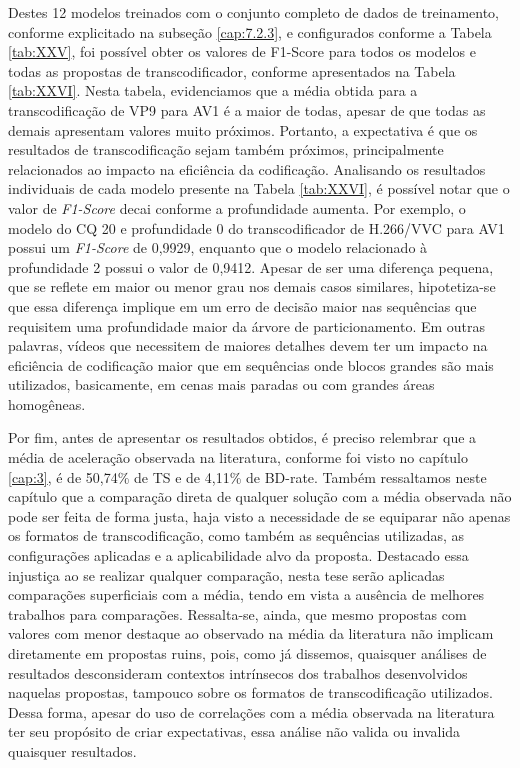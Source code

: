 Destes 12 modelos treinados com o conjunto completo de dados de treinamento, conforme explicitado na subseção \ref{cap:7.2.3}, e configurados conforme a Tabela \ref{tab:XXV}, foi possível obter os valores de F1-Score para todos os modelos e todas as propostas de transcodificador, conforme apresentados na Tabela \ref{tab:XXVI}. Nesta tabela, evidenciamos que a média obtida para a transcodificação de VP9 para AV1 é a maior de todas, apesar de que todas as demais apresentam valores muito próximos. Portanto, a expectativa é que os resultados de transcodificação sejam também próximos, principalmente relacionados ao impacto na eficiência da codificação. Analisando os resultados individuais de cada modelo presente na Tabela \ref{tab:XXVI}, é possível notar que o valor de \textit{F1-Score} decai conforme a profundidade aumenta. Por exemplo, o modelo do CQ 20 e profundidade 0 do transcodificador de H.266/VVC para AV1 possui um \textit{F1-Score} de 0,9929, enquanto que o modelo relacionado à profundidade 2 possui o valor de 0,9412. Apesar de ser uma diferença pequena, que se reflete em maior ou menor grau nos demais casos similares, hipotetiza-se que essa diferença implique em um erro de decisão maior nas sequências que requisitem uma profundidade maior da árvore de particionamento. Em outras palavras, vídeos que necessitem de maiores detalhes devem ter um impacto na eficiência de codificação maior que em sequências onde blocos grandes são mais utilizados, basicamente, em cenas mais paradas ou com grandes áreas homogêneas. 



Por fim, antes de apresentar os resultados obtidos, é preciso relembrar que a média de aceleração observada na literatura, conforme foi visto no capítulo \ref{cap:3}, é de 50,74\% de TS e de 4,11\% de BD-rate. Também ressaltamos neste capítulo que a comparação direta de qualquer solução com a média observada não pode ser feita de forma justa, haja visto a necessidade de se equiparar não apenas os formatos de transcodificação, como também as sequências utilizadas, as configurações aplicadas e a aplicabilidade alvo da proposta. Destacado essa injustiça ao se realizar qualquer comparação, nesta tese serão aplicadas comparações superficiais com a média, tendo em vista a ausência de melhores trabalhos para comparações. Ressalta-se, ainda, que mesmo propostas com valores com menor destaque ao observado na média da literatura não implicam diretamente em propostas ruins, pois, como já dissemos, quaisquer análises de resultados desconsideram contextos intrínsecos dos trabalhos desenvolvidos naquelas propostas, tampouco sobre os formatos de transcodificação utilizados. Dessa forma, apesar do uso de correlações com a média observada na literatura ter seu propósito de criar expectativas, essa análise não valida ou invalida quaisquer resultados.


